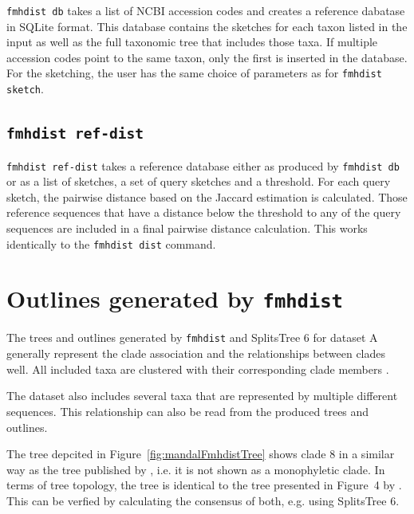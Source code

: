 \texttt{fmhdist db} takes a list of NCBI accession codes and creates a reference
dabatase in SQLite format. This database contains the sketches for each taxon
listed in the input as well as the full taxonomic tree that includes those taxa.
If multiple accession codes point to the same taxon, only the first is inserted
in the database. For the sketching, the user has the same choice of parameters
as for \texttt{fmhdist sketch}.

\subsection*{\texttt{fmhdist ref-dist}}

\texttt{fmhdist ref-dist} takes a reference database either as produced by
\texttt{fmhdist db} or as a list of sketches, a set of query sketches and a
threshold. For each query sketch, the pairwise distance based on the Jaccard
estimation is calculated. Those reference sequences that have a distance below
the threshold to any of the query sequences are included in a final pairwise
distance calculation. This works identically to the \texttt{fmhdist dist} command.



\section{Outlines generated by \texttt{fmhdist}} 

The trees and outlines generated by \texttt{fmhdist} and SplitsTree 6
\cite{husonApplicationPhylogeneticNetworks2006,bagciMicrobialPhylogeneticContext2021}
for dataset A generally represent the clade association and the relationships
between clades well. All included taxa are clustered with their corresponding
clade members
\cite{abadPhytophthoraTaxonomicPhylogenetic2023a,yangExpandedPhylogenyGenus2017}.

The dataset also includes several taxa that are represented by multiple
different sequences. This relationship can also be read from the produced trees
and outlines.

The tree depcited in Figure~\ref{fig:mandalFmhdistTree} shows clade 8 in a
similar way as the tree published by \cite{mandalComparativeGenomeAnalysis2022},
i.e. it is not shown as a monophyletic clade. In terms of tree topology, the
tree is identical to the tree presented in Figure~4 by
\cite{mandalComparativeGenomeAnalysis2022}. This can be verfied by calculating
the consensus of both, e.g. using SplitsTree
6\cite{husonApplicationPhylogeneticNetworks2006}. 

